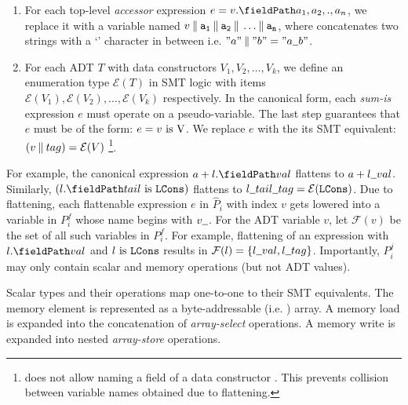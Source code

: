 \begin{enumerate}
\item For each top-level {\em accessor} expression $e = \prodAccess{v}{a_1,a_2,.,a_n}$, we replace it with a
variable named $v \mathbin\Vert{} {{\tt a_1}} \mathbin\Vert{} {{\tt a_2}} \mathbin\Vert{} \dots \mathbin\Vert{} {{\tt a_n}}$,
where \strcat{} concatenates two strings with a `\strsep{}' character in between i.e.
$"a" \strcat{} "b" = "a \strsep{} b"$.

\item For each ADT $T$ with data constructors $V_1,V_2,\dots,V_k$,
we define an enumeration type $\mathcal{E}(T)$ in SMT logic with items
$\mathcal{E}(V_1),\mathcal{E}(V_2),\dots,\mathcal{E}(V_k)$ respectively.
In the canonical form, each {\em sum-is} expression $e$ must operate on a pseudo-variable.
The last step guarantees that $e$ must be of the form: $e = v\ \mathrm{is}\ {\tt \textnormal{V}}$.
We replace $e$ with the its SMT equivalent: $(v \mathbin\Vert{} tag) = \mathcal{E}(V)$
\footnote{\SpecL{} does not allow naming a field of a data constructor .
This prevents collision between variable names obtained due to flattening.}.
\end{enumerate}

For example, the canonical expression $a + \prodAccess{l}{val}$ flattens to $a + l \strsep{} val$.
Similarly, $(\sumIs{\prodAccess{l}{tail}}{LCons})$ flattens to $l \strsep{} tail \strsep{} tag = \mathcal{E}(\cons{LCons})$.
Due to flattening, each flattenable expression $e$ in $\hat{P}_i$ with index $v$ gets lowered
into a variable in $P_i^f$ whose name begins with $v \strsep$.
For the ADT variable $v$, let $\mathcal{F}(v)$ be the set of all such variables in $P_i^f$.
For example, flattening of an expression with $\prodAccess{l}{val}$ and $l\ \mathrm{is}\ {\tt LCons}$
results in $\mathcal{F}(l) = \{ l \strsep{} val, l \strsep tag \}$.
Importantly, $P_i^j$ may only contain scalar and memory operations (but not ADT values).

Scalar types and their operations map one-to-one to their SMT equivalents.
The memory element \mem{} is represented as a byte-addressable (i.e. ) array.
A memory load  is expanded into the concatenation of  {\em array-select} operations.
A memory write  is expanded into  nested {\em array-store} operations.


